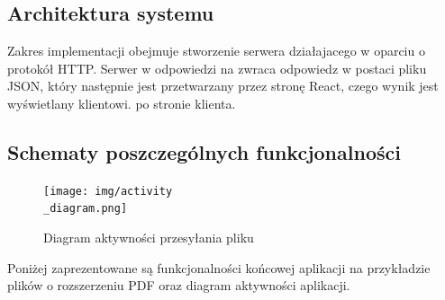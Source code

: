 \documentclass[12pt,a4paper,twoside]{article}
\begin{document}
\subsection{Architektura systemu} %
Zakres implementacji obejmuje stworzenie serwera działajacego w oparciu o protokół HTTP. Serwer w odpowiedzi na zwraca odpowiedz w postaci pliku JSON, który następnie jest przetwarzany przez stronę React, czego wynik jest wyświetlany klientowi.
po stronie klienta.
\subsection{Schematy poszczególnych funkcjonalności}
{\color{blue}{(tutaj zostaną dodane do każdego punktu zrzuty ekranu odpowiedzi serwera)}}\par
\begin{figure}[h!]
\centering
  \texttt{[image: img/activity\\\_diagram.png]}
  \caption{Diagram aktywności przesyłania pliku}
\end{figure}
Poniżej zaprezentowane są funkcjonalności końcowej aplikacji na przykładzie plików o rozszerzeniu PDF oraz diagram aktywności aplikacji.
\newpage
\end{document}
